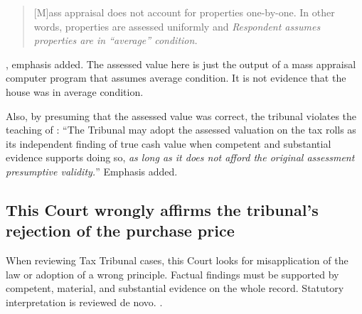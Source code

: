 \documentclass[12pt,\documentclassflag]{michiganCourtOfAppealsBrief}
\begin{document}
\begin{quote}
  [M]ass appraisal does not account for properties one-by-one. In other words, properties are assessed uniformly and \emph{Respondent assumes properties are in ``average'' condition.}
\end{quote}
\foj[4], emphasis added. The assessed value here is just the output of a mass appraisal computer program that assumes average condition. It is not evidence that the house was in average condition.

Also, by presuming that the assessed value was correct,  the tribunal violates the teaching of : ``The Tribunal may adopt the assessed valuation on the tax rolls as its independent finding of true cash value when competent and substantial evidence supports doing so, \emph{as long as it does not afford the original assessment presumptive validity.}'' Emphasis added.

\subsection{This Court wrongly affirms the tribunal's rejection of the purchase price}

When reviewing Tax Tribunal cases, this Court looks for misapplication of the law or adoption of a wrong principle. Factual findings must be supported by competent, material, and substantial evidence on the whole record. Statutory interpretation is reviewed de novo. .

\end{document}

